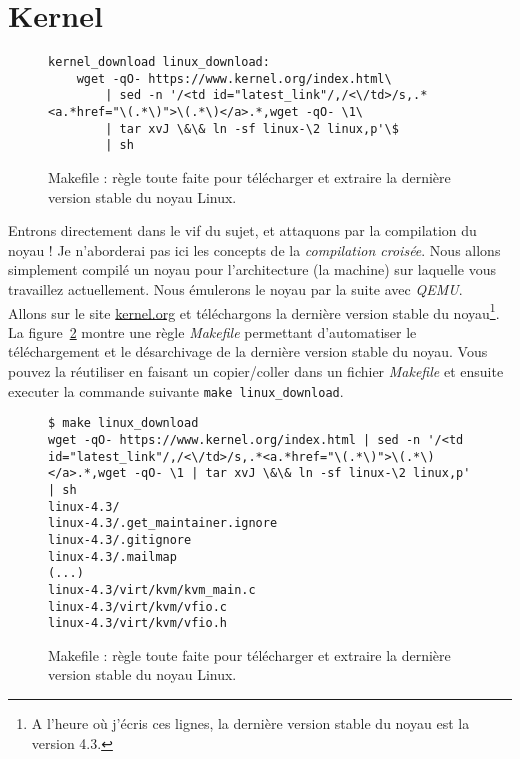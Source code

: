 \documentclass[a4paper]{article}
\begin{document}
\section{Kernel}

\begin{figure}
\label{makefile:linux_download}
\lstset{language=make,numbers=left,tabsize=2}
\begin{lstlisting}
kernel_download linux_download:
	wget -qO- https://www.kernel.org/index.html\
		| sed -n '/<td id="latest_link"/,/<\/td>/s,.*<a.*href="\(.*\)">\(.*\)</a>.*,wget -qO- \1\
		| tar xvJ \&\& ln -sf linux-\2 linux,p'\$
		| sh
\end{lstlisting}
\caption{Makefile : règle toute faite pour télécharger et extraire la dernière version stable du noyau Linux.}
\end{figure}

Entrons directement dans le vif du sujet, et attaquons par la compilation du noyau ! Je n'aborderai pas ici les concepts de la \textit{compilation croisée}. Nous allons simplement compilé un noyau pour l'architecture (la machine) sur laquelle vous travaillez actuellement. Nous émulerons le noyau par la suite avec \textit{QEMU}.\\

Allons sur le site \href{http://www.kernel.org}{kernel.org} et téléchargons la dernière version stable du noyau\footnote{A l'heure où j'écris ces lignes, la dernière version stable du noyau est la version 4.3.}. La figure~\ref{makefile:linux_download} montre une règle \textit{Makefile} permettant d'automatiser le téléchargement et le désarchivage de la dernière version stable du noyau. Vous pouvez la réutiliser en faisant un copier/coller dans un fichier \textit{Makefile} et ensuite executer la commande suivante \lstset{language=sh}\lstinline{make linux_download}.

\begin{figure}
\label{makefile:linux_download}
\begin{verbatim}
$ make linux_download 
wget -qO- https://www.kernel.org/index.html | sed -n '/<td id="latest_link"/,/<\/td>/s,.*<a.*href="\(.*\)">\(.*\)</a>.*,wget -qO- \1 | tar xvJ \&\& ln -sf linux-\2 linux,p' | sh
linux-4.3/
linux-4.3/.get_maintainer.ignore
linux-4.3/.gitignore
linux-4.3/.mailmap
(...)
linux-4.3/virt/kvm/kvm_main.c
linux-4.3/virt/kvm/vfio.c
linux-4.3/virt/kvm/vfio.h
\end{verbatim}
\caption{Makefile : règle toute faite pour télécharger et extraire la dernière version stable du noyau Linux.}
\end{figure}
\end{document}
